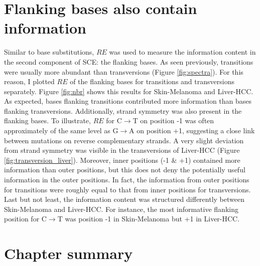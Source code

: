 

\section{Flanking bases also contain information}
Similar to base substitutions, $RE$ was used to measure the information content in the second component of SCE: the flanking bases. As seen previously, transitions were usually more abundant than transversions (Figure \ref{fig:spectra}). For this reason, I plotted $RE$ of the flanking bases for transitions and transversions separately. Figure \ref{fig:nbr} shows this results for Skin-Melanoma and Liver-HCC. As expected, bases flanking transitions contributed more information than bases flanking transversions. Additionally, strand symmetry was also present in the flanking bases. To illustrate, $RE$ for C$\rightarrow$T on position -1 was often approximately of the same level as G$\rightarrow$A on position +1, suggesting a close link between mutations on reverse complementary strands. A very slight deviation from strand symmetry was visible in the transversions of Liver-HCC (Figure \ref{fig:transversion_liver}). Moreover, inner positions (-1 \& +1) contained more information than outer positions, but this does not deny the potentially useful information in the outer positions. In fact, the information from outer positions for transitions were roughly equal to that from inner positions for transversions. Last but not least, the information content was structured differently between Skin-Melanoma and Liver-HCC. For instance, the most informative flanking position for C$\rightarrow$T was position -1 in Skin-Melanoma but +1 in Liver-HCC.



\section{Chapter summary}